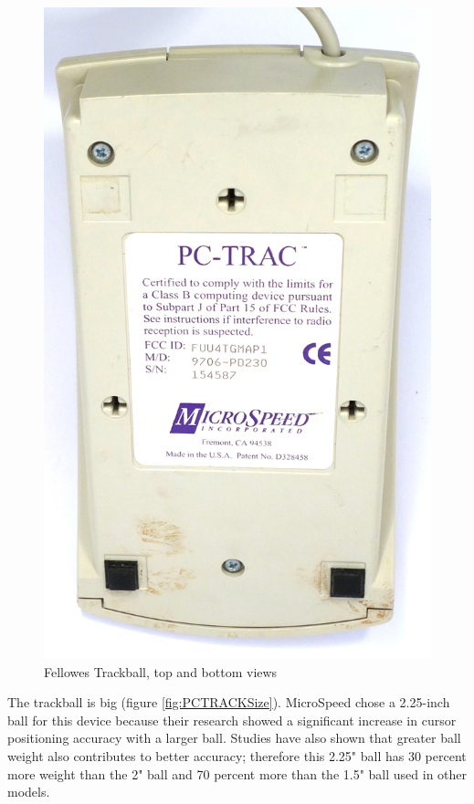 \documentclass[11pt, a4paper]{article}
\begin{document}
\begin{figure}[h]
    \includegraphics[scale=0.45]{1991_microspeed_pc-track/bottom_60.jpg}
    \caption{Fellowes Trackball, top and bottom views}
    \label{fig:PCTRACKTopBottom}
\end{figure}

The trackball is big (figure \ref{fig:PCTRACKSize}). MicroSpeed chose a 2.25-inch ball for this device because their research showed a significant increase in cursor positioning accuracy with a larger ball. Studies have also shown that greater ball weight also contributes to better accuracy; therefore this 2.25" ball has 30 percent more weight than the 2" ball and 70 percent more than the 1.5" ball used in other models.
\end{document}
